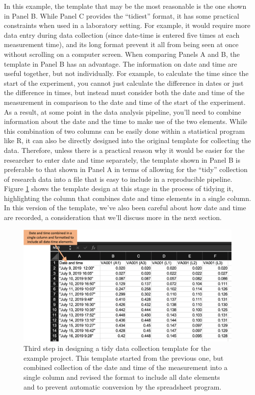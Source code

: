\documentclass[]{tufte-book}
\begin{document}
In this example, the template that may be the most reasonable is the one shown
in Panel B. While Panel C provides the ``tidiest'' format, it has some practical
constraints when used in a laboratory setting. For example, it would require
more data entry during data collection (since date-time is entered five times at
each measurement time), and its long format prevent it all from being seen at
once without scrolling on a computer screen. When comparing Panels A and B, the
template in Panel B has an advantage. The information on date and time are
useful together, but not individually. For example, to calculate the time since
the start of the experiment, you cannot just calculate the difference in dates
or just the difference in times, but instead must consider both the date and
time of the measurement in comparison to the date and time of the start of the
experiment. As a result, at some point in the data analysis pipeline, you'll
need to combine information about the date and the time to make use of the two
elements. While this combination of two columns can be easily done within a
statistical program like R, it can also be directly designed into the original
template for collecting the data. Therefore, unless there is a practical reason
why it would be easier for the researcher to enter date and time separately, the
template shown in Panel B is preferable to that shown in Panel A in terms of
allowing for the ``tidy'' collection of research data into a file that is easy to
include in a reproducible pipeline. Figure \ref{fig:step3} shows the template
design at this stage in the process of tidying it, highlighting the column that
combines date and time elements in a single column. In this version of the
template, we've also been careful about how date and time are recorded, a
consideration that we'll discuss more in the next section.

\begin{figure}
\includegraphics[width=\textwidth]{figures/growth_curve_step3} \caption[Third step in designing a tidy data collection template for the example project]{Third step in designing a tidy data collection template for the example project. This template started from the previous one, but combined collection of the date and time of the measurement into a single column and revised the format to include all date elements and to prevent automatic conversion by the spreadsheet program.}\label{fig:step3}
\end{figure}
\end{document}
